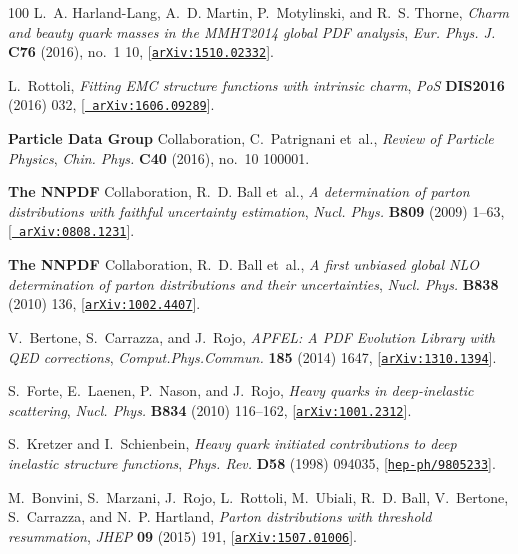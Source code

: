 \begin{thebibliography}{100}
L.~A. Harland-Lang, A.~D. Martin, P.~Motylinski, and R.~S. Thorne, {\it {Charm
  and beauty quark masses in the MMHT2014 global PDF analysis}},  {\em Eur.
  Phys. J.} {\bf C76} (2016), no.~1 10,
  [\href{http://arxiv.org/abs/1510.02332}{{\tt arXiv:1510.02332}}].

L.~Rottoli, {\it {Fitting EMC structure functions with intrinsic charm}},  {\em
  PoS} {\bf DIS2016} (2016) 032, [\href{http://arxiv.org/abs/1606.09289}{{\tt
  arXiv:1606.09289}}].

{\bf Particle Data Group} Collaboration, C.~Patrignani et~al., {\it {Review of
  Particle Physics}},  {\em Chin. Phys.} {\bf C40} (2016), no.~10 100001.

{\bf The NNPDF} Collaboration, R.~D. Ball et~al., {\it {A determination of
  parton distributions with faithful uncertainty estimation}},  {\em Nucl.
  Phys.} {\bf B809} (2009) 1--63, [\href{http://arxiv.org/abs/0808.1231}{{\tt
  arXiv:0808.1231}}].

{\bf {The NNPDF }} Collaboration, R.~D. Ball et~al., {\it {A first unbiased
  global NLO determination of parton distributions and their uncertainties}},
  {\em Nucl. Phys.} {\bf B838} (2010) 136,
  [\href{http://arxiv.org/abs/1002.4407}{{\tt arXiv:1002.4407}}].

V.~Bertone, S.~Carrazza, and J.~Rojo, {\it {APFEL: A PDF Evolution Library with
  QED corrections}},  {\em Comput.Phys.Commun.} {\bf 185} (2014) 1647,
  [\href{http://arxiv.org/abs/1310.1394}{{\tt arXiv:1310.1394}}].

S.~Forte, E.~Laenen, P.~Nason, and J.~Rojo, {\it {Heavy quarks in
  deep-inelastic scattering}},  {\em Nucl. Phys.} {\bf B834} (2010) 116--162,
  [\href{http://arxiv.org/abs/1001.2312}{{\tt arXiv:1001.2312}}].

S.~Kretzer and I.~Schienbein, {\it {Heavy quark initiated contributions to deep
  inelastic structure functions}},  {\em Phys. Rev.} {\bf D58} (1998) 094035,
  [\href{http://arxiv.org/abs/hep-ph/9805233}{{\tt hep-ph/9805233}}].

M.~Bonvini, S.~Marzani, J.~Rojo, L.~Rottoli, M.~Ubiali, R.~D. Ball, V.~Bertone,
  S.~Carrazza, and N.~P. Hartland, {\it {Parton distributions with threshold
  resummation}},  {\em JHEP} {\bf 09} (2015) 191,
  [\href{http://arxiv.org/abs/1507.01006}{{\tt arXiv:1507.01006}}].


\end{thebibliography}
